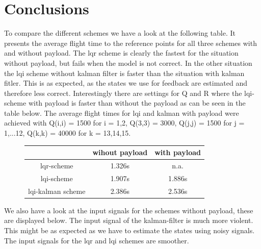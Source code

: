 \documentclass[]{article}
\begin{document}
\section{Conclusions}
To compare the different schemes we have a look at the following table. It presents the average flight time to the reference points for all three schemes with and without payload. The lqr scheme is clearly the fastest for the situation without payload, but fails when the model is not correct. In the other situation the lqi scheme without kalman filter is faster than the situation with kalman fitler. This is as expected, as the states we use for feedback are estimated and therefore less correct. Interestingly there are settings for Q and R where the lqi-scheme with payload is faster than without the payload as can be seen in the table below. The average flight times for lqi and kalman with payload were achieved with Q(i,i)  = 1500 for i = 1,2, Q(3,3) = 3000, Q(j,j) = 1500 for j = 1,...12, Q(k,k) = 40000 for k = 13,14,15. 

\begin{figure}[H]
\centering
\begin{tabular}{|c|c|c|}
\hline
& wihout payload & with payload \\
\hline
lqr-scheme &  1.326s  & n.a.   \\
lqi-scheme &  1.907s	&  1.886s \\
lqi-kalman scheme & 2.386s	 & 2.536s \\
\hline
\end{tabular}
\end{figure}

We also have a look at the input signals for the schemes without payload, these are displayed below. The input signal of the kalman-filter is much more violent. This might be as expected as we have to estimate the states using noisy signals. The input signals for the lqr and lqi schemes are smoother. 
\end{document}
